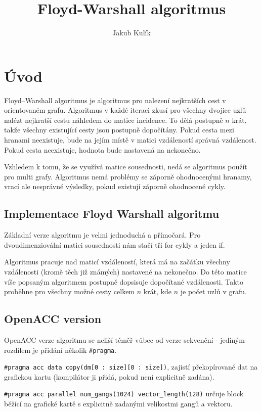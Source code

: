 \documentclass[11pt, fleqn]{article}
\title{Floyd-Warshall algoritmus}
\author{Jakub Kulík}
\begin{document}
\maketitle

\section{Úvod}
Floyd–Warshall algoritmus je algoritmus pro nalezení nejkratších cest v orientovaném grafu. Algoritmus v každé iteraci zkusí pro všechny dvojice uzlů nalézt nejkratší cestu náhledem do matice incidence. To dělá postupně $n$ krát, takže všechny existující cesty jsou postupně dopočítány. Pokud cesta mezi hranami neexistuje, bude na jejím místě v matici vzdáleností správná vzdálenost. Pokud cesta neexistuje, hodnota bude nastavená na nekonečno.

Vzhledem k tomu, že se využívá matice sousednosti, nedá se algoritmus použít pro multi grafy. Algoritmus nemá problémy se záporně ohodnocenými hranamy, vrací ale nesprávné výsledky, pokud existují záporně ohodnocené cykly.

\subsection{Implementace Floyd Warshall algoritmu}
Základní verze algoritmu je velmi jednoduchá a přímočará. Pro dvoudimenziovální matici sousednosti nám stačí tři for cykly a jeden if.

Algoritmus pracuje nad maticí vzdáleností, která má na začátku všechny vzdálenosti (kromě těch již známých) nastavené na nekonečno. Do této matice víše popsaným algoritmem postupně dopsisuje dopočítané vzdálenosti. Takto proběhne pro všechny možné cesty celkem $n$ krát, kde $n$ je počet uzlů v grafu.

\subsection{OpenACC version}
OpenACC verze algoritmu se neliší téměř vůbec od verze sekvenční - jediným rozdílem je přidání několik \lstinline{#pragma}.

\lstinline{#pragma acc data copy(dm[0 : size][0 : size])}, zajistí překopírované dat na grafickou kartu (kompilátor ji přidá, pokud není explicitně zadána).

\lstinline{#pragma acc parallel num_gangs(1024) vector_length(128)} určuje block běžící na grafické kartě s explicitně zadanými velikostmi gangů a vektoru.
\end{document}
